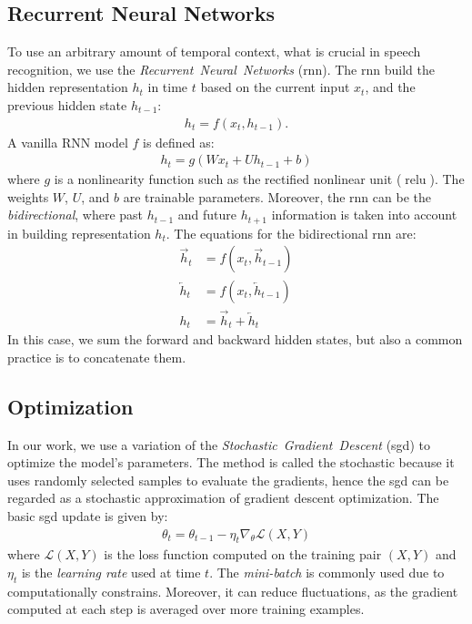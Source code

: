 \subsection*{Recurrent Neural Networks}

To use an arbitrary amount of temporal context, what is crucial in speech recognition, we use the
\textit{Recurrent~Neural~Networks} (\acrshort{rnn}).
The \acrshort{rnn} build the hidden representation $h_t$ in time $t$
based on the current input $x_t$, and the previous hidden state $h_{t-1}$:
\begin{align}
h_t = f(x_t, h_{t-1}).
\end{align}
A vanilla RNN model $f$ is defined as:
\begin{align}
    h_t = g(W x_t + U h_{t-1} + b)
\end{align}
where $g$ is a nonlinearity function such as the rectified nonlinear unit ($\operatorname{relu}$).
The weights $W$, $U$, and $b$ are trainable parameters.
Moreover, the \acrshort{rnn} can be the \textit{bidirectional}, where past $h_{t-1}$
and future $h_{t+1}$ information is taken into account in building representation $h_t$.
The equations for the bidirectional \acrshort{rnn} are:
\begin{align}
    \overrightarrow{h}_t &= f(x_t, \overrightarrow{h}_{t-1}) \\
    \overleftarrow{h}_t &= f(x_t, \overleftarrow{h}_{t-1})   \\
    h_t &= \overrightarrow{h}_t + \overleftarrow{h}_t
\end{align}
In this case, we sum the forward and backward hidden states, but also a common
practice is to concatenate them.


\subsection*{Optimization}

In our work, we use a variation of the \textit{Stochastic~Gradient~Descent} (\acrshort{sgd})
to optimize the model's parameters.
The method is called the stochastic because it uses randomly selected samples to evaluate
the gradients, hence the \acrshort{sgd} can be regarded as a stochastic approximation of
gradient descent optimization.
The basic \acrshort{sgd} update is given by:
\begin{align}
    \theta_{t} = \theta_{t-1} - \eta_t \nabla_{\theta} \mathcal{L}(X, Y)
\end{align}
where $\mathcal{L}(X, Y)$ is the loss function computed on the training pair
$(X, Y)$ and $\eta_t$ is the \textit{learning rate} used at time $t$.
The \textit{mini-batch} is commonly used due to computationally constrains.
Moreover, it can reduce fluctuations, as the gradient computed at each step
is averaged over more training examples.

